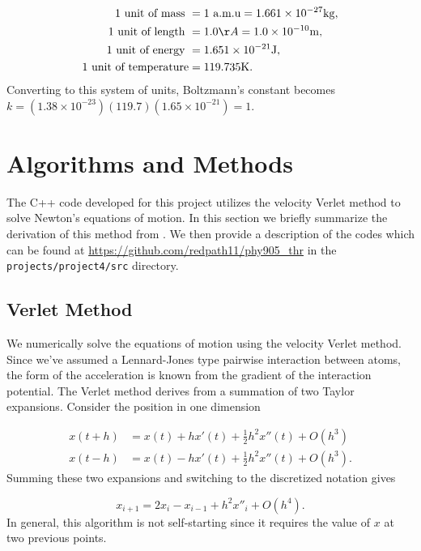 \documentclass[10pt,showpacs,preprintnumbers,footinbib,amsmath,amssymb,aps,prl,twocolumn,groupedaddress,superscriptaddress,showkeys]{revtex4-1}
\newcommand{\pwrten}[1]{%
	\ensuremath{10^{#1}} }
\begin{document}
\begin{align*}
	\text{1 unit of mass } &= 1 \text{ a.m.u} = 1.661\times 10^{-27}\mathrm{kg},\\
	\text{1 unit of length } &= 1.0 {\AA} = 1.0\times 10^{-10}\mathrm{m},\\
	\text{1 unit of energy } &= 1.651\times 10^{-21}\mathrm{J},\\
	\text{1 unit of temperature} &= 119.735\mathrm{K}.
\end{align*}
Converting to this system of units, Boltzmann's constant becomes
$k = (1.38 \times \pwrten{-23} )(119.7)(1.65 \times \pwrten{-21}) = 1$.

\section*{Algorithms and Methods}

The C++ code developed for this project utilizes the velocity
Verlet method to solve Newton's equations of motion. In this section we briefly
summarize the derivation of this method from \citet{Morten}. We
then provide a description of the codes which can be
found at \url{https://github.com/redpath11/phy905_thr} in the
\texttt{projects/project4/src} directory.

\subsection*{Verlet Method}

We numerically solve the equations of motion using the velocity
Verlet method. Since we've assumed a Lennard-Jones type
pairwise interaction between atoms, the form of the acceleration
is known from the gradient of the interaction potential. The Verlet
method derives from a summation of two Taylor expansions. Consider
the position in one dimension

\begin{align*}
	x(t+h) &= x(t) + h x'(t) + \frac{1}{2} h^2  x''(t) + O(h^3)\\
	x(t-h) &= x(t)  - h x'(t) + \frac{1}{2} h^2  x''(t) + O(h^3).
\end{align*}
Summing these two expansions and switching to the discretized
notation gives

\begin{equation*}
	x_{i+1} = 2 x_i - x_{i-1} + h^2 x''_i + O(h^4).
\end{equation*}
In general, this algorithm is not self-starting since it requires the
value of $x$ at two previous points.
\end{document}
